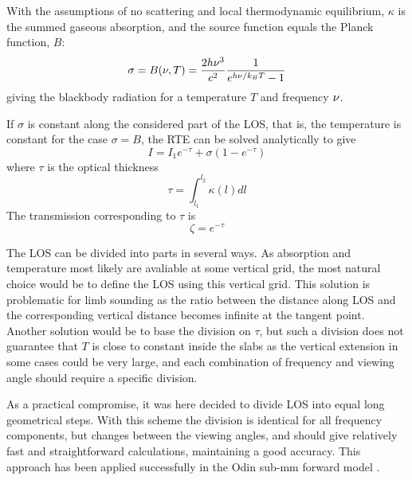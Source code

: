  With the assumptions of no scattering and local thermodynamic
 equilibrium, $\kappa$ is the summed gaseous absorption, and the source
 function equals the Planck function, $B$:
 \begin{equation}
    \sigma = B(\nu,T) = \frac{2h\nu^3}{c^2} \frac{1}{e^{h\nu/k_B T}-1}
    \label{eq:rte:planck}
 \end{equation}
 giving the blackbody radiation for a temperature $T$ and frequency
 $\nu$.
  
 If $\sigma$ is constant along the considered part of the LOS, that is, the
 temperature is constant for the case $\sigma=B$, the RTE can be solved
 analytically to give
 \begin{equation}
   I = I_1e^{-\tau} + \sigma\left(1-e^{-\tau}\right)
  \label{eq:rte:step}
 \end{equation}
 where $\tau$ is the optical thickness
 \begin{equation}
   \tau = \int_{l_1}^{l_2}{\kappa(l)dl}
 \end{equation}
 The transmission corresponding to $\tau$ is
 \begin{equation}
   \zeta = e^{-\tau}
 \end{equation}  



 \label{sec:rte:practical}
 
 The LOS can be divided into parts in several ways. As absorption and
 temperature most likely are avaliable at some vertical grid, the most
 natural choice would be to define the LOS using this vertical grid.
 This solution is problematic for limb sounding as the ratio between
 the distance along LOS and the corresponding vertical distance
 becomes infinite at the tangent point. Another solution would be to
 base the division on $\tau$, but such a division does not guarantee
 that $T$ is close to constant inside the slabs as the vertical
 extension in some cases could be very large, and each combination of
 frequency and viewing angle should require a specific division.
  
 As a practical compromise, it was here decided to divide LOS into
 equal long geometrical steps. With this scheme the division is
 identical for all frequency components, but changes between the
 viewing angles, and should give relatively fast and straightforward
 calculations, maintaining a good accuracy. This approach has
 been applied successfully in the Odin sub-mm forward model 
 \citep{eriksson:97a,eriksson:00a}.
  
